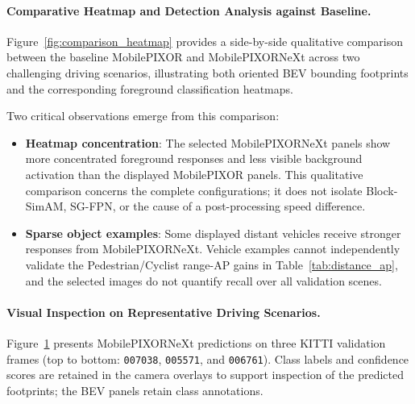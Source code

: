 \paragraph{Comparative Heatmap and Detection Analysis against Baseline.}
Figure~\ref{fig:comparison_heatmap} provides a side-by-side qualitative comparison between the baseline MobilePIXOR and MobilePIXORNeXt across two challenging driving scenarios, illustrating both oriented BEV bounding footprints and the corresponding foreground classification heatmaps.

Two critical observations emerge from this comparison:
\begin{itemize}
    \item \textbf{Heatmap concentration}: The selected MobilePIXORNeXt panels show more concentrated foreground responses and less visible background activation than the displayed MobilePIXOR panels. This qualitative comparison concerns the complete configurations; it does not isolate Block-SimAM, SG-FPN, or the cause of a post-processing speed difference.
    \item \textbf{Sparse object examples}: Some displayed distant vehicles receive stronger responses from MobilePIXORNeXt. Vehicle examples cannot independently validate the Pedestrian/Cyclist range-AP gains in Table~\ref{tab:distance_ap}, and the selected images do not quantify recall over all validation scenes.
\end{itemize}

\paragraph{Visual Inspection on Representative Driving Scenarios.}
Figure~\ref{fig:qualitative_detections} presents MobilePIXORNeXt predictions on three KITTI validation frames (top to bottom: \texttt{007038}, \texttt{005571}, and \texttt{006761}). Class labels and confidence scores are retained in the camera overlays to support inspection of the predicted footprints; the BEV panels retain class annotations.

\begin{figure}[!t]
\centering
{}
\label{fig:qualitative_detections}
\end{figure}

